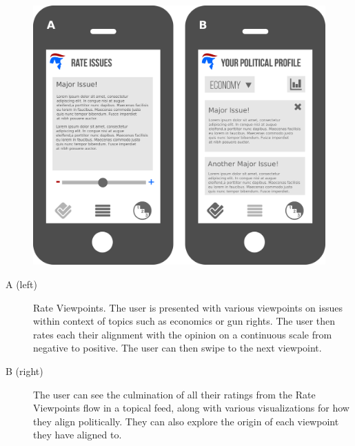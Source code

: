 \documentclass[11pt]{article}
\begin{document}
\begin{figure}[h]
    \includegraphics[width = \textwidth]{first.png}
\end{figure}

\begin{description}
    \item[A (left)] Rate Viewpoints. The user is presented with various viewpoints on issues within context of topics such as economics or gun rights. The user then rates each their alignment with the opinion on a continuous scale from negative to positive. The user can then swipe to the next viewpoint.
    \item[B (right)] The user can see the culmination of all their ratings from the Rate Viewpoints flow in a topical feed, along with various visualizations for how they align politically. They can also explore the origin of each viewpoint they have aligned to.
\end{description}

\newpage
\end{document}
